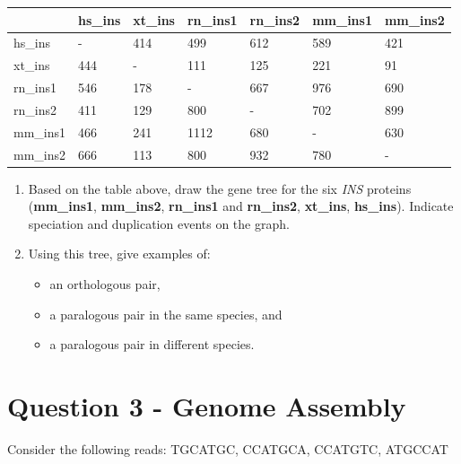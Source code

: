 \documentclass[a4paper,11pt]{article}
\begin{document}
\begin{center}
	\begin{tabular} {| l || l | l | l | l | l | l |}
	\hline
 	                    & hs\_ins & xt\_ins & rn\_ins1 & rn\_ins2 & mm\_ins1 & mm\_ins2 \\ \hline\hline
	hs\_ins        & -            & 414             &  499         & 612       & 589           & 421 \\	\hline
	xt\_ins      & 444       & -                  &  111        & 125       & 221           & 91 \\	\hline
	rn\_ins1       & 546      & 178              & -             & 667       & 976           & 690 \\	\hline
	rn\_ins2       & 411      & 129              & 800        & -            & 702           & 899 \\	\hline
	mm\_ins1    & 466      & 241              & 1112      & 680       & -                & 630 \\ 	\hline
	mm\_ins2    & 666      & 113              & 800        & 932       & 780           & - \\
	\hline
	\end{tabular}
\end{center}
\vspace{0.05 cm}

\begin{enumerate}
\item Based on the table above, draw the gene tree for the six \textit{INS}
  proteins ({\bf mm\_ins1}, {\bf mm\_ins2}, {\bf rn\_ins1} and {\bf rn\_ins2}, {\bf xt\_ins}, {\bf hs\_ins}). 
  Indicate speciation and duplication events on the graph.
\item Using this tree, give examples of:
  \begin{itemize} 
  \item an orthologous pair, 
  \item a paralogous pair in the same species, and 
  \item a paralogous pair in different species.
  \end{itemize}
\end{enumerate}


\section*{Question 3 - Genome Assembly}

Consider the following reads:
TGCATGC, CCATGCA, CCATGTC, ATGCCAT
\end{document}
